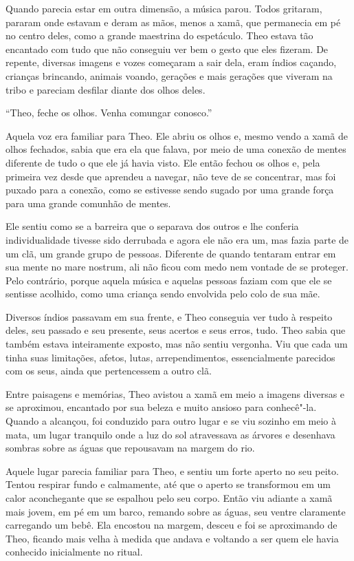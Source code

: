 Quando parecia estar em outra dimensão, a música parou. Todos gritaram,
pararam onde estavam e deram as mãos, menos a xamã, que permanecia em pé
no centro deles, como a grande maestrina do espetáculo. Theo estava tão
encantado com tudo que não conseguiu ver bem o gesto que eles fizeram.
De repente, diversas imagens e vozes começaram a sair dela, eram índios
caçando, crianças brincando, animais voando, gerações e mais gerações
que viveram na tribo e pareciam desfilar diante dos olhos deles.

``Theo, feche os olhos. Venha comungar conosco.''

Aquela voz era familiar para Theo. Ele abriu os olhos e, mesmo vendo a
xamã de olhos fechados, sabia que era ela que falava, por meio de
uma conexão de mentes diferente de tudo o que ele já havia visto. Ele
então fechou os olhos e, pela primeira vez desde que aprendeu a navegar,
não teve de se concentrar, mas foi puxado para a conexão, como se
estivesse sendo sugado por uma grande força para uma grande comunhão de
mentes.

Ele sentiu como se a barreira que o separava dos outros e lhe conferia
individualidade tivesse sido derrubada e agora ele não era um, mas fazia
parte de um clã, um grande grupo de pessoas. Diferente de quando
tentaram entrar em sua mente no mare nostrum,
ali não ficou com medo nem vontade de se proteger. Pelo contrário,
porque aquela música e aquelas pessoas faziam com que ele se sentisse
acolhido, como uma criança sendo envolvida pelo colo de sua mãe.

Diversos índios passavam em sua frente, e Theo conseguia ver tudo à
respeito deles, seu passado e seu presente, seus acertos e seus erros,
tudo. Theo sabia que também estava inteiramente exposto, mas não sentiu
vergonha. Viu que cada um tinha suas limitações, afetos, lutas,
arrependimentos, essencialmente parecidos com os seus, ainda que
pertencessem a outro clã.

Entre paisagens e memórias, Theo avistou a xamã em meio a imagens
diversas e se aproximou, encantado por sua beleza e muito ansioso para
conhecê"-la. Quando a alcançou, foi conduzido para outro lugar e se viu
sozinho em meio à mata, um lugar tranquilo onde a luz do sol atravessava
as árvores e desenhava sombras sobre as águas que repousavam na margem
do rio.

Aquele lugar parecia familiar para Theo, e sentiu um forte aperto no
seu peito. Tentou respirar fundo e calmamente, até que o aperto se
transformou em um calor aconchegante que se espalhou pelo seu corpo.
Então viu adiante a xamã mais jovem, em pé em um barco, remando sobre as
águas, seu ventre claramente carregando um bebê. Ela encostou na margem,
desceu e foi se aproximando de Theo, ficando mais velha à medida que
andava e voltando a ser quem ele havia conhecido inicialmente no ritual.

